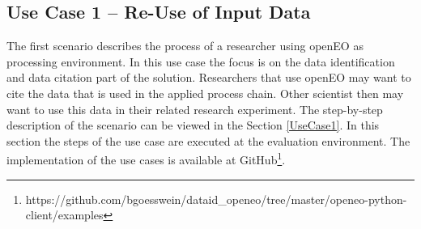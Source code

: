 \documentclass[draft,final]{vutinfth} %
\begin{document}
\subsection{Use Case 1 – Re-Use of Input Data}\label{Implementation:Use Case1}
The first scenario describes the process of a researcher using openEO as processing environment. In this use case the focus is on the data identification and data citation part of the solution. Researchers that use openEO may want to cite the data that is used in the applied process chain. Other scientist then may want to use this data in their related research experiment. The step-by-step description of the scenario can be viewed in the Section \ref{UseCase1}. In this section the steps of the use case are executed at the evaluation environment. The implementation of the use cases is available at GitHub\footnote{https://github.com/bgoesswein/dataid\_openeo/tree/master/openeo-python-client/examples}.
\end{document}
